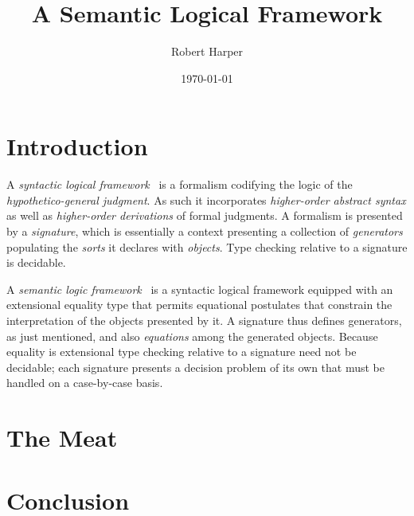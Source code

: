 \documentclass[11pt,twoside]{article}
\begin{document}
\title{A Semantic Logical Framework}
\author{Robert Harper}
\date{\today}

\maketitle{}

\section{Introduction}

A \emph{syntactic logical framework}~\citep{harper-etal:lf} is a formalism codifying the logic of the
\emph{hypothetico-general judgment}.  As such it incorporates \emph{higher-order abstract
  syntax} as well as \emph{higher-order derivations} of formal judgments.  A formalism is
presented by a \emph{signature}, which is essentially a context presenting a collection of
\emph{generators} populating the \emph{sorts} it declares with \emph{objects}.  Type
checking relative to a signature is decidable.

A \emph{semantic logic framework}~\citep{smith1990programming} is a syntactic logical
framework equipped with an extensional equality type that permits equational postulates
that constrain the interpretation of the objects presented by it.  A signature thus
defines generators, as just mentioned, and also \emph{equations} among the generated
objects.  Because equality is extensional type checking relative to a signature need not
be decidable; each signature presents a decision problem of its own that must be handled
on a case-by-case basis.

\section{The Meat}

\section{Conclusion}



\end{document}

